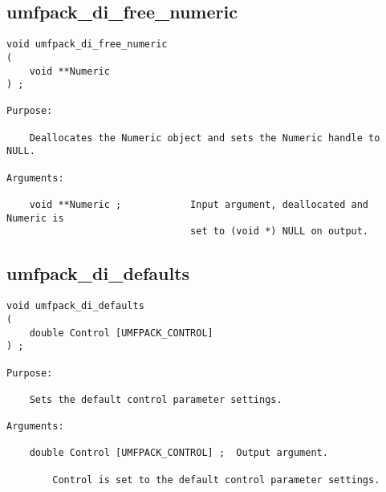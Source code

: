 \documentclass[11pt]{article}
\begin{document}
\subsection{umfpack\_di\_free\_numeric}

{\footnotesize
\begin{verbatim}
void umfpack_di_free_numeric
(
    void **Numeric
) ;

Purpose:

    Deallocates the Numeric object and sets the Numeric handle to NULL.

Arguments:

    void **Numeric ;            Input argument, deallocated and Numeric is
                                set to (void *) NULL on output.
\end{verbatim}
}

\subsection{umfpack\_di\_defaults}

{\footnotesize
\begin{verbatim}
void umfpack_di_defaults
(
    double Control [UMFPACK_CONTROL]
) ;

Purpose:

    Sets the default control parameter settings.

Arguments:

    double Control [UMFPACK_CONTROL] ;  Output argument.

        Control is set to the default control parameter settings.
\end{verbatim}
}
\end{document}
